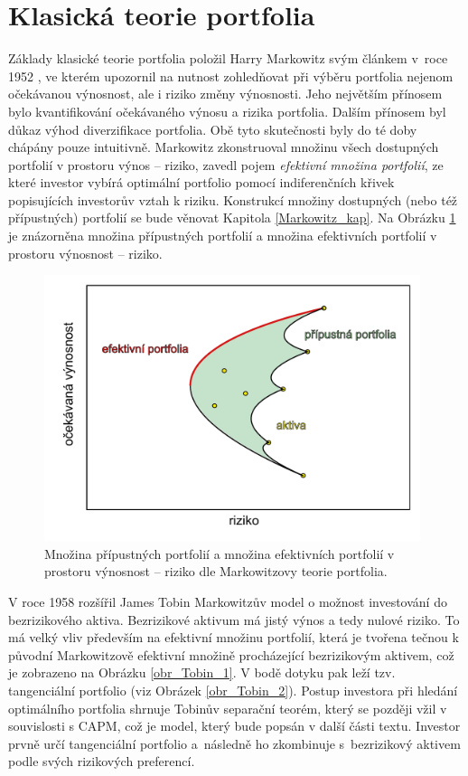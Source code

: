 \documentclass[a4paper,12pt]{report}
\theoremstyle{definition} \newtheorem{definice}[veta]{Definice}
\theoremstyle{remark}
\begin{document}


\section{Klasická teorie portfolia}\label{KTP}

Základy klasické teorie portfolia položil Harry Markowitz svým článkem v~roce 1952 \cite{markowitz}, ve kterém upozornil na nutnost zohledňovat při výběru portfolia nejenom očekávanou výnosnost, ale i riziko změny výnosnosti.
Jeho největším přínosem bylo kvantifikování očekávaného výnosu a rizika portfolia. 
Dalším přínosem byl důkaz výhod diverzifikace portfolia.
Obě tyto skutečnosti byly do té doby chápány pouze intuitivně.
Markowitz zkonstruoval množinu všech dostupných portfolií v prostoru výnos -- riziko, zavedl pojem \textit{efektivní množina portfolií}, ze které investor vybírá optimální portfolio pomocí indiferenčních křivek popisujících investorův vztah k riziku.
Konstrukcí množiny dostupných (nebo též přípustných) portfolií se bude věnovat Kapitola \ref{Markowitz_kap}. 
Na Obrázku \ref{obr_Markowitz} je znázorněna množina přípustných portfolií  a množina efektivních portfolií v prostoru výnosnost -- riziko. 

\begin{figure}[!htbp]
  \centering 
  \includegraphics[width=11cm]{IMG/graf_2a.pdf}
  \caption{Množina přípustných portfolií  a množina efektivních portfolií v prostoru výnosnost -- riziko dle Markowitzovy teorie portfolia.} 
  \label{obr_Markowitz}
\end{figure}

V roce 1958 rozšířil James Tobin \cite{tobin} Markowitzův model o možnost investování do bezrizikového aktiva.
Bezrizikové aktivum má jistý výnos a tedy nulové riziko.
To má velký vliv především na efektivní množinu portfolií, která je tvořena tečnou k původní Markowitzově efektivní množině procházející bezrizikovým aktivem, což je zobrazeno na Obrázku \ref{obr_Tobin_1}.
V bodě dotyku pak leží tzv. tangenciální portfolio (viz Obrázek \ref{obr_Tobin_2}).
Postup investora při hledání optimálního portfolia shrnuje Tobinův separační teorém, který se později vžil v souvislosti s CAPM, což je model, který bude popsán v další části textu. %
Investor prvně určí tangenciální portfolio a~následně ho zkombinuje s~bezrizikový aktivem podle svých rizikových preferencí.
\end{document}
